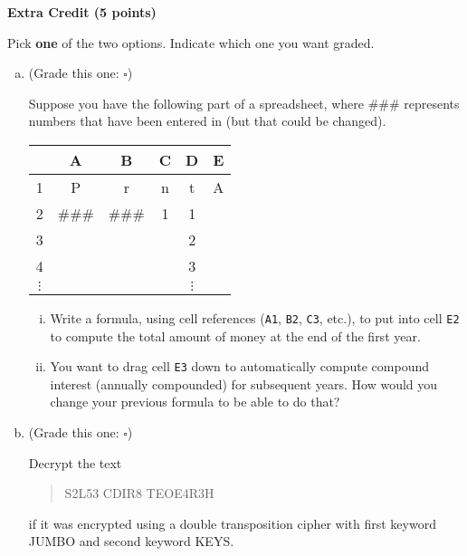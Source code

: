 \documentclass[12pt]{article}
\newcommand{\be}{\begin{enumerate}}
\newcommand{\ee}{\end{enumerate}}
\begin{document}
\newpage


\textbf{Extra Credit (5 points)} 

Pick \textbf{one} of the two options. Indicate which one you want graded.
	\begin{enumerate}[(a)]
	\item (Grade this one: {\Large{${\square}$}}) 
	
	Suppose you have the following part of a spreadsheet, where \#\#\# represents numbers that have been entered in (but that could be changed).
	
	\begin{tabular}{c || c | c  | c| c|  p{2cm} | }
	 & A & B & C & D & E \\ \hline \hline
	1 & P & r & n & t & A \\ \hline
	2 & \#\#\# & \#\#\# & 1 & 1 & \\ \hline
	3 & &&&2& \\ \hline 
		4 & &&&3& \\ \hline 
			$\vdots$ & && & $\vdots$& \\ \hline 
	\end{tabular}
	
	
	\be[i.]
	\item Write a formula, using cell references (\verb`A1`, \verb`B2`, \verb`C3`, etc.), to put into cell \verb`E2` to compute the total amount of money at the end of the first year.
	
	\vspace{1in}
	
	\item You want to drag cell \verb`E3` down to automatically compute compound interest (annually compounded) for subsequent years. How would you change your previous formula to be able to do that?
		\vspace{1in}
	
	\ee
	
	\item (Grade this one: {\Large{${\square}$}}) 
	
	Decrypt the text 
	\begin{quote}S2L53 \:\:CDIR8 \:\:TEOE4\:\:R3H  \end{quote}if it was encrypted using a double transposition cipher with first keyword JUMBO and second keyword KEYS.
	\vfill
	\end{enumerate}
	
	
	\newpage
	
\end{document}
